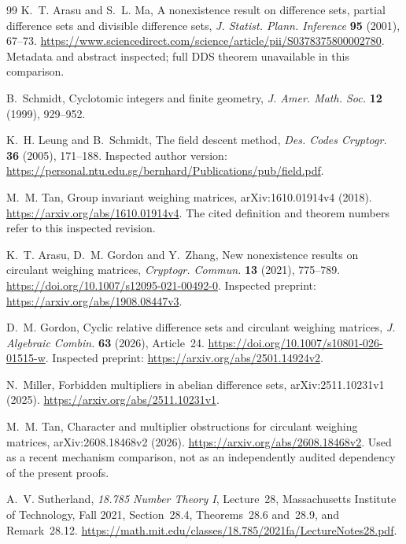 \documentclass[11pt]{article}
\theoremstyle{definition}
\theoremstyle{remark}
\begin{document}
\begin{thebibliography}{99}
K.~T. Arasu and S.~L. Ma,
A nonexistence result on difference sets, partial difference sets and
divisible difference sets,
\emph{J. Statist. Plann. Inference} \textbf{95} (2001), 67--73.
\url{https://www.sciencedirect.com/science/article/pii/S0378375800002780}.
Metadata and abstract inspected; full DDS theorem unavailable in this comparison.

B.~Schmidt, Cyclotomic integers and finite geometry,
\emph{J. Amer. Math. Soc.} \textbf{12} (1999), 929--952.

K.~H. Leung and B.~Schmidt, The field descent method,
\emph{Des. Codes Cryptogr.} \textbf{36} (2005), 171--188.
Inspected author version:
\url{https://personal.ntu.edu.sg/bernhard/Publications/pub/field.pdf}.

M.~M. Tan, Group invariant weighing matrices,
arXiv:1610.01914v4 (2018).
\url{https://arxiv.org/abs/1610.01914v4}.
The cited definition and theorem numbers refer to this inspected revision.

K.~T. Arasu, D.~M. Gordon and Y.~Zhang,
New nonexistence results on circulant weighing matrices,
\emph{Cryptogr. Commun.} \textbf{13} (2021), 775--789.
\url{https://doi.org/10.1007/s12095-021-00492-0}.
Inspected preprint: \url{https://arxiv.org/abs/1908.08447v3}.

D.~M. Gordon, Cyclic relative difference sets and circulant weighing matrices,
\emph{J. Algebraic Combin.} \textbf{63} (2026), Article~24.
\url{https://doi.org/10.1007/s10801-026-01515-w}.
Inspected preprint: \url{https://arxiv.org/abs/2501.14924v2}.

N.~Miller, Forbidden multipliers in abelian difference sets,
arXiv:2511.10231v1 (2025).
\url{https://arxiv.org/abs/2511.10231v1}.

M.~M. Tan, Character and multiplier obstructions for circulant weighing matrices,
arXiv:2608.18468v2 (2026).
\url{https://arxiv.org/abs/2608.18468v2}.
Used as a recent mechanism comparison, not as an independently audited
dependency of the present proofs.

A.~V. Sutherland, \emph{18.785 Number Theory I}, Lecture~28,
Massachusetts Institute of Technology, Fall 2021,
Section~28.4, Theorems~28.6 and~28.9, and Remark~28.12.
\url{https://math.mit.edu/classes/18.785/2021fa/LectureNotes28.pdf}.

\end{thebibliography}
\end{document}
